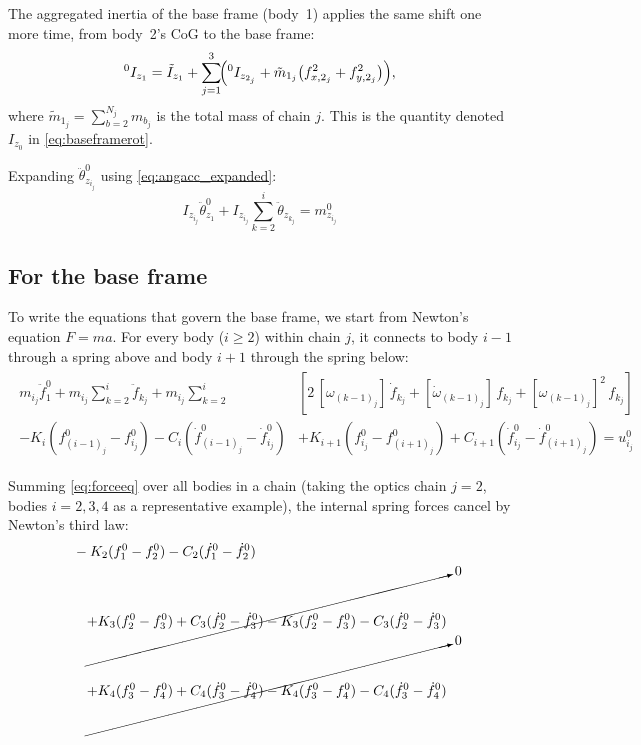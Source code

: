 \documentclass[11pt]{article}
\theoremstyle{definition}
\begin{document}
The aggregated inertia of the base frame (body~1) applies the same shift one more time, from body~2's CoG to the base frame:
\begin{equation} \label{eq:Iz0}
    {}^0I_{z_1} = \tilde{I}_{z_1}
    + \sum_{j=1}^{3}\!\Bigl({}^0I_{z_{2_j}}
      + \tilde{m}_{1_j}\bigl(f_{x,2_j}^2 + f_{y,2_j}^2\bigr)\Bigr),
\end{equation}
where $\tilde{m}_{1_j} = \sum_{b=2}^{N_j} m_{b_j}$ is the total mass of chain $j$. This is the quantity denoted $I_{z_0}$ in \eqref{eq:baseframerot}.

Expanding $\ddot{\theta}^0_{z_{i_j}}$ using \eqref{eq:angacc_expanded}:
\begin{equation} \label{eq:torqueeq_expanded}
    I_{z_{i_j}}\ddot{\theta}^{0}_{z_1} 
    + I_{z_{i_j}}\sum^{i}_{k=2}\ddot{\theta}_{z_{k_j}}
    = m^0_{z_{i_j}}
\end{equation}

\subsection{For the base frame}

To write the equations that govern the base frame, we start from Newton's equation $F = ma$. For every body ($i \geq 2$) within chain $j$, it connects to body $i-1$ through a spring above and body $i+1$ through the spring below:
\begin{align} \label{eq:forceeq}
    \begin{split}
        m_{i_j}\ddot{f}^{0}_{1}
        + m_{i_j}\sum^{i}_{k=2}\ddot{f}_{k_j}
        + m_{i_j}\sum^{i}_{k=2}
        &\left[
            2\,[\omega_{(k-1)_j}]\,\dot{f}_{k_j}
            + [\dot{\omega}_{(k-1)_j}]\,f_{k_j}
            + [\omega_{(k-1)_j}]^2\,f_{k_j}
        \right] \\
        - K_i\left( f^0_{{(i-1)}_j} - f^0_{{i}_j}\right)
        - C_i\left( \dot{f}^0_{{(i-1)}_j} - \dot{f}^0_{{i}_j}\right)
        &+ K_{i+1}\left( f^0_{{i}_j} - f^0_{{(i+1)}_j}\right)
        + C_{i+1}\left( \dot{f}^0_{{i}_j} - \dot{f}^0_{{(i+1)}_j}\right)
        = u^0_{i_j}
    \end{split}
\end{align}

Summing \eqref{eq:forceeq} over all bodies in a chain (taking the optics chain $j=2$, bodies $i=2,3,4$ as a representative example), the internal spring forces cancel by Newton's third law:
\begin{align}
    &- K_2(f^0_1 - f^0_2) - C_2(\dot{f}^0_1 - \dot{f}^0_2) \notag \\
    &\quad \cancelto{0}{
        + K_3(f^0_2 - f^0_3) + C_3(\dot{f}^0_2 - \dot{f}^0_3)
        - K_3(f^0_2 - f^0_3) - C_3(\dot{f}^0_2 - \dot{f}^0_3)
    } \notag \\
    &\quad \cancelto{0}{
        + K_4(f^0_3 - f^0_4) + C_4(\dot{f}^0_3 - \dot{f}^0_4)
        - K_4(f^0_3 - f^0_4) - C_4(\dot{f}^0_3 - \dot{f}^0_4)
    } \notag
\end{align}
\end{document}
